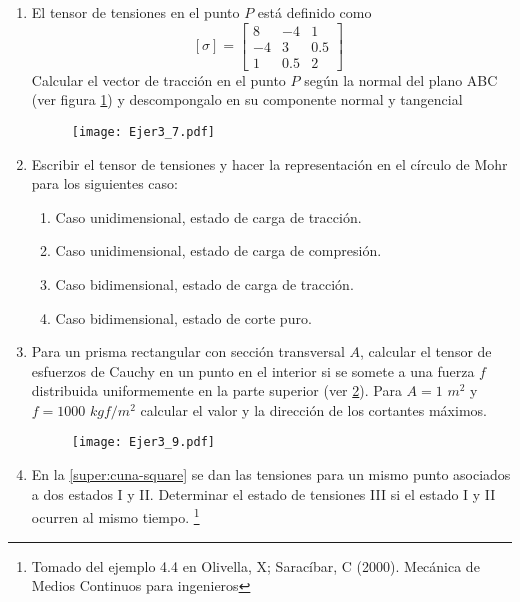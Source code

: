 \documentclass[../notas medios.tex]{subfiles}
\begin{document}
\begin{enumerate}
\item \label{punto07} El tensor de tensiones en el punto $P$ est\'a definido
como
%	
		\[{[\sigma]} = \left[ \begin{array}{ccc}
		8 & -4 & 1 \\ 
		-4 & 3 & 0.5 \\ 
		1 & 0.5 & 2
		\end{array}  \right] \enspace\]
Calcular el vector de tracci\'on en el punto $P$ seg\'un la normal del plano ABC
(ver figura \cref{norplano}) y descompongalo en su componente normal y tangencial
%
\begin{figure}[H]
	\centering
	\texttt{[image: Ejer3\_7.pdf]}
	\caption{}
	\label{norplano}
\end{figure}
\item \label{punto08} Escribir el tensor de tensiones y hacer la
representaci\'on en el c\'irculo de Mohr para los siguientes caso:
%
\begin{enumerate}
	\item Caso unidimensional, estado de carga de tracci\'on.
	\item Caso unidimensional, estado de carga de compresi\'on.
	\item Caso bidimensional, estado de carga de tracci\'on.
	\item Caso bidimensional, estado de corte puro.
\end{enumerate}
\item \label{punto09} Para un prisma rectangular con secci\'on transversal $A$,
calcular el tensor de esfuerzos de Cauchy en un punto en el interior si se somete a una fuerza $f$ distribuida uniformemente en la parte superior (ver \cref{prisma}). 
Para $A=1$ $m^2$ y $f=1000$ $kgf/m^2$ calcular el valor
y la direcci\'on de los cortantes m\'aximos.\\
%
\begin{figure}[H]
	\centering
	\texttt{[image: Ejer3\_9.pdf]}
	\caption{}
	\label{prisma}
\end{figure}
\item \label{punto10} En la \cref{super:cuna-square} se dan las tensiones
para un mismo punto asociados a dos estados I y II. Determinar el estado de tensiones III si el estado I y II ocurren al mismo tiempo. \footnote{Tomado del ejemplo 4.4 en Olivella, X; Saracíbar, C (2000). Mecánica de Medios Continuos para ingenieros}\\

\end{enumerate}
\end{document}
